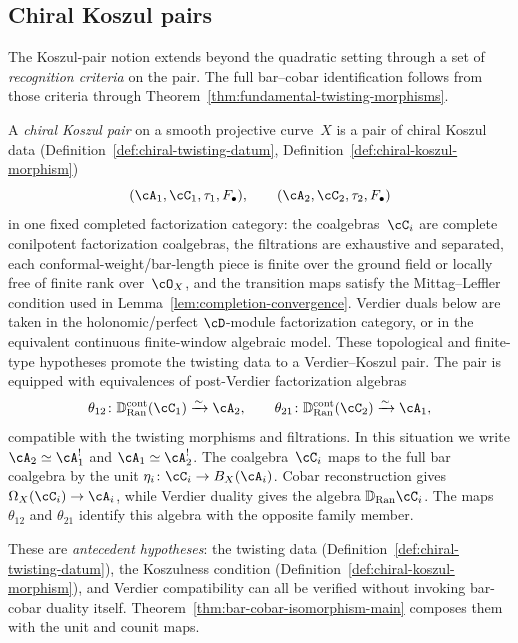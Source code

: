 \subsection{Chiral Koszul pairs}

The Koszul-pair notion extends beyond the quadratic setting through a
set of \emph{recognition criteria} on the pair.  The full bar--cobar
identification follows from those criteria through
Theorem~\ref{thm:fundamental-twisting-morphisms}.

\begin{definition}\label{def:chiral-koszul-pair}
A \emph{chiral Koszul pair} on a smooth projective curve~$X$
is a pair of chiral Koszul data
\textup{(}Definition~\textup{\ref{def:chiral-twisting-datum}},
Definition~\textup{\ref{def:chiral-koszul-morphism})}
\[
(\cA_1, \cC_1, \tau_1, F_\bullet), \qquad
(\cA_2, \cC_2, \tau_2, F_\bullet)
\]
in one fixed completed factorization category: the coalgebras~$\cC_i$ are complete
conilpotent factorization coalgebras, the filtrations are exhaustive
and separated, each conformal-weight/bar-length piece is finite over
the ground field or locally free of finite rank over~$\cO_X$, and the
transition maps satisfy the Mittag--Leffler condition used in
Lemma~\ref{lem:completion-convergence}. Verdier duals below are taken
in the holonomic/perfect $\cD$-module factorization category, or in the
equivalent continuous finite-window algebraic model. These
topological and finite-type hypotheses promote the twisting data to a
Verdier--Koszul pair. The pair is equipped with equivalences of
post-Verdier factorization algebras
\[
\theta_{12}\colon
\mathbb{D}_{\operatorname{Ran}}^{\mathrm{cont}}(\cC_1)
\xrightarrow{\sim}\cA_2,
\qquad
\theta_{21}\colon
\mathbb{D}_{\operatorname{Ran}}^{\mathrm{cont}}(\cC_2)
\xrightarrow{\sim}\cA_1,
\]
compatible with the twisting morphisms and filtrations.
In this situation we write $\cA_2 \simeq \cA_1^!$ and
$\cA_1 \simeq \cA_2^!$.
The coalgebra~$\cC_i$ maps to the full bar coalgebra by the unit
$\eta_i\colon\cC_i\to B_X(\cA_i)$. Cobar reconstruction gives
$\Omega_X(\cC_i)\to\cA_i$, while Verdier duality gives the algebra
$\mathbb D_{\operatorname{Ran}}\cC_i$. The maps~$\theta_{12}$ and
$\theta_{21}$ identify this algebra with the opposite family member.

\smallskip\noindent
These are \emph{antecedent hypotheses}: the twisting data
(Definition~\ref{def:chiral-twisting-datum}), the Koszulness
condition (Definition~\ref{def:chiral-koszul-morphism}),
and Verdier compatibility can all be verified without
invoking bar-cobar duality itself.
Theorem~\ref{thm:bar-cobar-isomorphism-main} composes them with the
unit and counit maps.


\end{definition}
